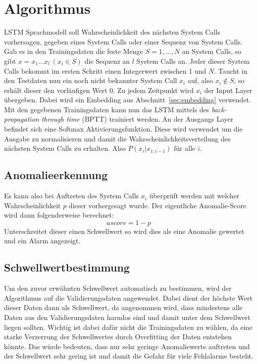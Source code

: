     \section{Algorithmus}\label{sec:Algorithmus}
        LSTM Sprachmodell soll Wahrscheinlichkeit des nächsten System Calls vorhersagen, gegeben eines System Calls oder einer Sequenz von System Calls.
        Gab es in den Trainingsdaten die feste Menge $S = {1,\dots,N}$ an System Calls, so gibt $x=x_1\dots x_l \ (x_i\in S)$ die Sequenz an $l$ System Calls an.
        Jeder dieser System Calls bekommt im ersten Schritt einen Integerwert zwischen 1 und $N$.
        Taucht in den Testdaten nun ein noch nicht bekannter System Call $x_i$ auf, also $x_i \notin S$, so erhält dieser den vorläufigen Wert 0.
        Zu jedem Zeitpunkt wird $x_i$ der Input Layer übergeben.
        Dabei wird ein Embedding aus Abschnitt~\ref{sec:embedding} verwendet. 
        Mit den gegebenen Trainingsdaten kann nun das LSTM mittels des \textit{back-propagation through time} (BPTT) trainiert werden.
        An der Ausgangs Layer befindet sich eine Softmax Aktivierungsfunktion.
        Diese wird verwendet um die Ausgabe zu normalisieren und damit die Wahrscheinlichkeitsverteilung des nächsten System Calls zu erhalten.
        Also $P\left(x_i|x_{1:i-1}\right)$ für alle $i$. 
        
        \subsection{Anomalieerkennung}\label{sec:Anomalieerkennung}
            Es kann also bei Auftreten des System Calls $x_i$ überprüft werden mit welcher Wahrscheinlichkeit $p$ dieser vorhergesagt wurde.
            Der eigentliche Anomalie-Score wird dann folgenderweise berechnet:
            \begin{equation}
                ascore = 1 - p
            \end{equation}
            Unterschreitet dieser einen Schwellwert so wird dies als eine Anomalie gewertet und ein Alarm angezeigt.
            \subsection{Schwellwertbestimmung}
            Um den zuvor erwähnten Schwellwert automatisch zu bestimmen, wird der Algorithmus auf die Validierungsdaten angewendet. 
            Dabei dient der höchste Wert dieser Daten dann als Schwellwert, da angenommen wird, dass mindestens alle Daten aus den Validierungsdaten harmlos sind und damit unter dem Schwellwert liegen sollten.
            Wichtig ist dabei dafür nicht die Trainingsdaten zu wählen, da eine starke Verzerrung der Schwellwertes durch Overfitting der Daten entstehen könnte. 
            Das würde bedeuten, dass nur sehr geringe Anomaliewerte auftreten und der Schwellwert sehr gering ist und damit die Gefahr für viele Fehlalarme besteht.

